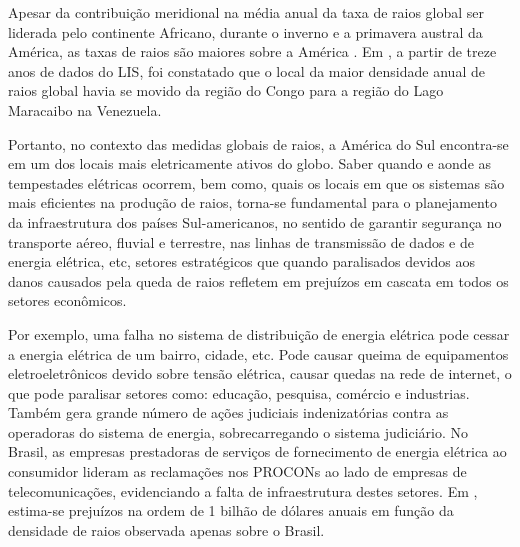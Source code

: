 Apesar da contribuição meridional na média anual da taxa de raios global ser liderada pelo continente Africano, durante o inverno e a primavera austral da América, as taxas de raios são maiores sobre a América \cite{christian2003global}. Em , a partir de treze anos de dados do LIS, foi constatado que o local da maior densidade anual de raios global havia se movido da região do Congo para a região do Lago Maracaibo na Venezuela.

Portanto, no contexto das medidas globais de raios, a América do Sul encontra-se em um dos locais mais eletricamente ativos do globo. Saber quando e aonde as tempestades elétricas ocorrem, bem como, quais os locais em que os sistemas são mais eficientes na produção de raios, torna-se fundamental para o planejamento da infraestrutura dos países Sul-americanos, no sentido de garantir segurança no transporte aéreo, fluvial e terrestre, nas linhas de transmissão de dados e de energia elétrica, etc, setores estratégicos que quando paralisados devidos aos danos causados pela queda de raios refletem em prejuízos em cascata em todos os setores econômicos. 

Por exemplo, uma falha no sistema de distribuição de energia elétrica pode cessar a energia elétrica de um bairro, cidade, etc. Pode causar queima de equipamentos eletroeletrônicos devido sobre tensão elétrica, causar quedas na rede de internet, o que pode paralisar  setores como: educação, pesquisa, comércio e industrias. Também gera grande número de ações judiciais indenizatórias contra as operadoras do sistema de energia, sobrecarregando o sistema judiciário. No Brasil, as empresas prestadoras de serviços de  fornecimento de energia elétrica ao consumidor lideram as reclamações nos PROCONs ao lado de empresas de telecomunicações, evidenciando a falta de infraestrutura destes setores. Em , estima-se prejuízos na ordem de 1 bilhão de dólares anuais em função da densidade de raios observada apenas sobre o Brasil. 
  
    

